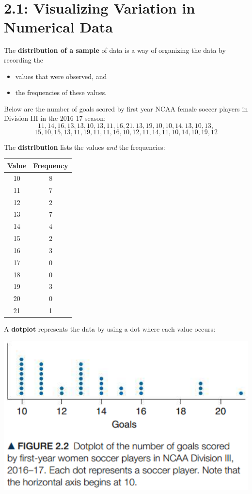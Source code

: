 \documentclass[../mathNotesPreamble]{subfiles}
\providecommand{\relscalefact}{1.4}
\begin{document}
\relscale{\relscalefact}
  \section{2.1: Visualizing Variation in Numerical Data}
  \begin{defn*}
    The \textbf{distribution of a sample} of data is a way of organizing the data by recording the
    \begin{itemize}
      \item values that were observed, and
      \item the frequencies of these values.
    \end{itemize}
  \end{defn*}

  \begin{ex*}
    Below are the number of goals scored by first year NCAA female soccer players in Division III in the 2016-17 season:
    \[11, 14, 16, 13, 13, 10, 13, 11, 16, 21, 13, 19, 10, 10, 14, 13, 10, 13, \]
    \[15, 10, 15, 13, 11, 19, 11, 11, 16, 10, 12, 11, 14, 11, 10, 14, 10, 19, 12\]
  \end{ex*}
  \noindent
  The \textbf{distribution} lists the values \emph{and} the frequencies:
  \begin{flushright}
    \begin{tabular}{@{}cc@{}}\toprule
      Value & Frequency \\\midrule
      10 & 8 \\
      11 & 7 \\
      12 & 2 \\
      13 & 7 \\
      14 & 4 \\
      15 & 2 \\
      16 & 3 \\
      17 & 0 \\
      18 & 0 \\
      19 & 3 \\
      20 & 0 \\
      21 & 1 \\\bottomrule
    \end{tabular}
  \end{flushright}
  \pagebreak

  \noindent
  A \textbf{dotplot} represents the data by using a dot where each value occurs:
  \begin{center}
    \includegraphics[width=0.5\linewidth]{images/math211_figure_2p02}
  \end{center}
\end{document}
